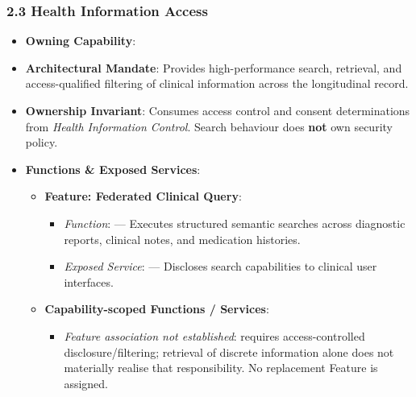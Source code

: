 \subsubsection*{2.3 Health Information Access}
\label{rad:ise:73}

\begin{itemize}

\item
\textbf{Owning Capability}: \texttt{}



\item
\textbf{Architectural Mandate}: Provides high-performance search, retrieval, and access-qualified filtering of clinical information across the longitudinal record.



\item
\textbf{Ownership Invariant}: Consumes access control and consent determinations from \emph{Health Information Control}. Search behaviour does \textbf{not} own security policy.



\item
\textbf{Functions \& Exposed Services}:


\begin{itemize}

\item
\textbf{Feature: Federated Clinical Query}:


\begin{itemize}

\item
\emph{Function}: \texttt{} — Executes structured semantic searches across diagnostic reports, clinical notes, and medication histories.



\item
\emph{Exposed Service}: \texttt{} — Discloses search capabilities to clinical user interfaces.



\end{itemize}


\item
\textbf{Capability-scoped Functions /\allowbreak{} Services}:


\begin{itemize}

\item
\emph{Feature association not established}: \texttt{} requires access-controlled disclosure/\allowbreak{}filtering; retrieval of discrete information alone does not materially realise that responsibility. No replacement Feature is assigned.




\end{itemize}
\end{itemize}
\end{itemize}

